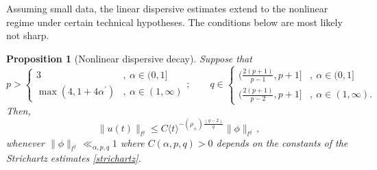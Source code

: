 \documentclass{article}
\numberwithin{equation}{section}
\newtheorem{proposition}{Proposition}[section]
\begin{document}
Assuming small data, the linear dispersive estimates extend to the nonlinear regime under certain technical hypotheses. The conditions below are most likely not sharp.
\begin{proposition}[Nonlinear dispersive decay]\label{nonlinear_decay}
Suppose that
\begin{equation*}
p > 
\begin{cases}
            3
            & ,\ \alpha \in (0,1]\\
            \max(4,1+4\alpha^\prime) & ,\ \alpha \in (1,\infty)
\end{cases}
;\qquad q \in
\begin{cases}
            (\frac{2(p+1)}{p-1},p+1]
            & ,\ \alpha \in (0,1]\\
            (\frac{2(p+1)}{p-2},p+1] & ,\ \alpha \in (1,\infty).
    \end{cases}    
\end{equation*}
Then,
\begin{equation}\label{nonlinear_estimate}
    \| u(t) \|_{l^q} \leq C \langle t \rangle^{-(\rho_{\pm})\frac{(q-2)}{q}} \| \phi \|_{l^{q^\prime}},
\end{equation}
whenever $\| \phi \|_{l^{q^\prime}} \ll_{\alpha,p,q} 1$ where $C(\alpha,p,q)>0$ depends on the constants of the Strichartz estimates \eqref{strichartz}.
\end{proposition}
\end{document}

